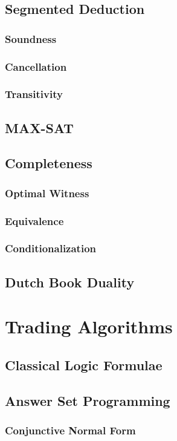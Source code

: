 \documentclass[a4paper,11pt]{book}
\begin{document}
\section{Segmented Deduction}
\subsection{Soundness}
\subsection{Cancellation}
\subsection{Transitivity}
\section{MAX-SAT}
\section{Completeness}
\subsection{Optimal Witness}
\subsection{Equivalence}
\subsection{Conditionalization}
\section{Dutch Book Duality}

\chapter{Trading Algorithms}
\section{Classical Logic Formulae}
\section{Answer Set Programming}
\subsection{Conjunctive Normal Form}
\end{document}
